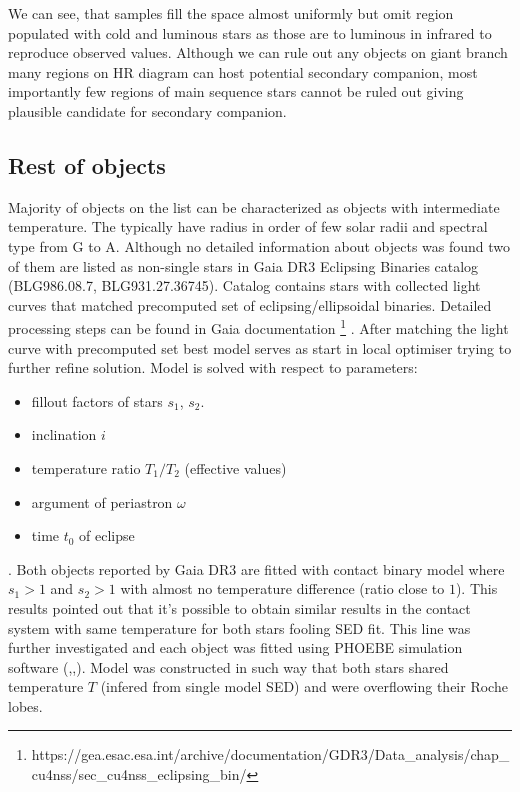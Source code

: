 \documentclass{pracalicmgr}
\begin{document}
We can see, that samples fill the space almost uniformly but omit region populated with cold and luminous stars as 
those are to luminous in infrared to reproduce observed values.
Although we can rule out any objects on giant branch many regions on HR diagram can host potential secondary companion, most importantly
few regions of main sequence stars cannot be ruled out giving plausible candidate for secondary companion.
\subsection{Rest of objects}
Majority of objects on the list can be characterized as objects with intermediate temperature. The typically have radius in order of 
few solar radii and spectral type from G to A. Although no detailed information about objects was found two of them
are listed as non-single stars in Gaia DR3 Eclipsing Binaries catalog (BLG986.08.7, BLG931.27.36745).
Catalog contains stars with collected light curves that matched precomputed set of eclipsing/ellipsoidal binaries. 
Detailed processing steps can be found in Gaia documentation \footnote[1]{https://gea.esac.esa.int/archive/documentation/GDR3/Data\_analysis/chap\_cu4nss/sec\_cu4nss\_eclipsing\_bin/}
. After matching the light curve with precomputed set best model serves as start in local optimiser 
trying to further refine solution. Model is solved with respect to parameters:
\begin{itemize}
    \item fillout factors of stars $s_1$, $s_2$.
    \item inclination $i$
    \item temperature ratio $T_1/T_2$ (effective values)
    \item argument of periastron $\omega$
    \item time $t_0$ of eclipse
\end{itemize}. 
Both objects reported by Gaia DR3 are fitted with contact binary model where $s_1>1$ and $s_2>1$ with almost no 
temperature difference (ratio close to $1$). This results pointed out that it's possible to obtain similar results 
in the contact system with same temperature for both stars fooling SED fit. 
This line was further investigated and each object was fitted using 
PHOEBE simulation software (\citet*{wilson_realization_1971},\citet*{prsa_computational_2005},\citet*{conroy_physics_2020}). Model was constructed in such way that both stars shared temperature $T$ (infered from 
single model SED) and were overflowing their Roche lobes.
\end{document}
